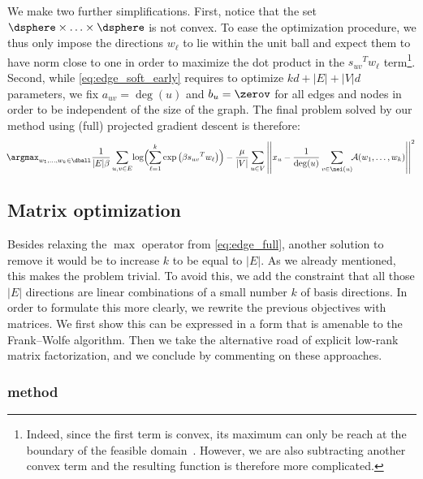 We make two further simplifications. First, notice that the set $\dsphere \times \ldots \times
\dsphere$ is not convex. To ease
the optimization procedure, we thus only impose the directions $w_\ell$ to lie within the unit ball
and expect them to have norm close to one in order to maximize the dot product in the ${s_{uv}}^T
w_\ell$ term\footnote{Indeed, since the first term is convex, its maximum can only be reach at the
boundary of the feasible domain~\autocite[Theorem 32.1]{convexAnalysis70}. However, we are also
subtracting another convex term and the resulting function is therefore more complicated.}.
Second, while \eqref{eq:edge_soft_early} requires to optimize
$kd + |E| + |V|d$ parameters, we fix $a_{uv} = \deg(u)$ and $b_u = \zerov$ for all edges and nodes in order
to be independent of the size of the graph. The final problem solved by our \combined{} method using
(full) projected gradient descent is therefore:
\begin{equation}
  \label{eq:edge_soft}
\!  \argmax_{w_1,\ldots,w_k \in \dball}
  \frac{1}{|E|\beta} \sum_{u,v\in E}\!
  \log\Bigl(\sum_{\ell=1}^k\exp\left(\beta {s_{uv}}^T w_\ell \right)\Bigr)
  - \frac{\mu}{|V|}\sum_{u\in V} \left|\left| x_u  - \frac{1}{\deg(u)}
  \sum_{v \in \nei(u)}\!\! \mathcal{A}(w_1,\ldots,w_k) \right|\right|^2
\end{equation}

\subsection{Matrix optimization}
\label{sub:edge_matrix}

Besides relaxing the $\max$ operator from \eqref{eq:edge_full}, another solution to remove it would
be to increase $k$ to be equal to $|E|$. As we already mentioned, this makes the problem trivial. To
avoid this, we add the constraint that all those $|E|$ directions are linear combinations of a small
number $k$ of basis directions. In order to formulate this more clearly, we rewrite the previous
objectives with matrices. We first show this can be expressed in a form that is amenable to the
Frank--Wolfe algorithm. Then we take the alternative road of explicit low-rank matrix factorization,
and we conclude by commenting on these approaches.

\subsubsection{\fwa{} method}
\label{ssub:edge_frank_wolfe}

